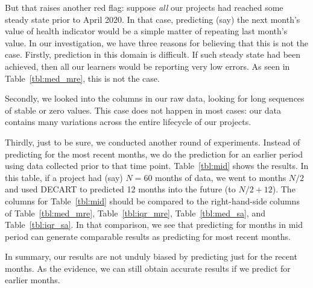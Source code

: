 \documentclass[smallextended]{svjour3}
\begin{document}
But that raises another red flag: suppose {\em all} our projects had reached some steady state prior to April 2020. In that case, predicting (say) the next month's value of health indicator would be a simple matter of repeating last month's value. In our investigation, we have three reasons for believing that this is not the case.
Firstly, prediction in this domain is difficult. If such steady state had been achieved, then all our learners would be reporting very low errors. As seen in Table~\ref{tbl:med_mre}, this is not the case.

Secondly, we looked into the columns in our raw data, looking for long sequences of stable or zero values. This case does not happen in most cases: our data contains many variations across the entire lifecycle of our projects.

Thirdly, just to be sure, we conducted another round of experiments. Instead of predicting for the most recent months, we do the prediction for an earlier period using
data collected prior to that time point.
Table~\ref{tbl:mid} shows the results. In this table, if a project had (say) $N=60$ months of data, we went to months $N/2$ and used DECART to predicted 12 months into the future (to $N/2+12$). The columns for Table~\ref{tbl:mid}  should be compared to the right-hand-side columns of Table~\ref{tbl:med_mre}, Table~\ref{tbl:iqr_mre},  Table~\ref{tbl:med_sa}, and Table~\ref{tbl:iqr_sa}. In that comparison, we see that predicting for months in mid period can
generate comparable results as predicting for most recent months.
 
In summary, our results are not unduly biased by predicting just for the recent months. As the evidence, we can still obtain accurate results if we predict for earlier months.
\end{document}
